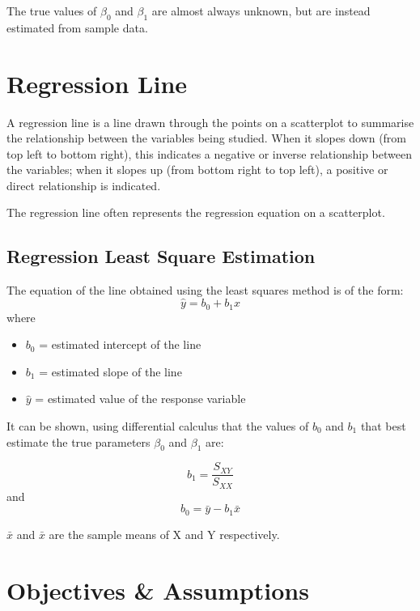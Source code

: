 \documentclass[]{report}
\begin{document}
The true values of $\beta_0$ and  $\beta_1$ are almost always unknown, but are instead estimated from sample data.

	

\section{Regression Line}




A regression line is a line drawn through the points on a scatterplot to summarise the relationship between the variables being studied. When it slopes down (from top left to bottom right), this indicates a negative or inverse relationship between the variables; when it slopes up (from bottom right to top left), a positive or direct relationship is indicated.

The regression line often represents the regression equation on a scatterplot.



\subsection{Regression Least Square Estimation}
The
equation of the line obtained using the least squares method is of the form:
\[ \hat{y} = b_0 + b_1x \]
where
\begin{itemize}
	\item $b_0$ = estimated intercept of the line
	\item $b_1$ = estimated slope of the line
	\item $\hat{y}$ = estimated value of the response variable
\end{itemize}

It can be shown, using differential calculus that the values of $b_0$
and $b_1$ that best estimate the true parameters $\beta_0$ and $\beta_1$ are:

\[ b_1 = \frac{S_{XY}}{S_{XX}}\]
and
\[ b_0 = \bar{y} - b_1 \bar{x} \]

$\bar{x}$ and $\bar{x}$ are the sample means of X and Y respectively.



\section*{Objectives \& Assumptions} 
\end{document}
